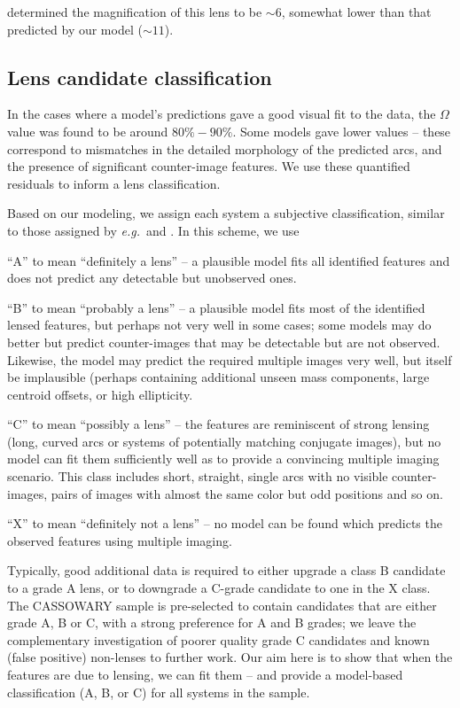 \documentclass[iop]{emulateapj}
\def\eg{{\it e.g.}\,}
\begin{document}
\citeauthor{Pet++10} determined the magnification of this lens to be $\sim 6$,
somewhat lower than that predicted by our model ($\sim 11$). 


\subsection{Lens candidate classification}
\label{sec:results:class}

In the cases where a model's predictions gave a good visual fit to the data,
the $\Omega$ value was found to be around $80\%-90\%$. Some models gave  lower
values -- these correspond to mismatches in the detailed morphology of the
predicted arcs, and the presence of significant counter-image features. We use
these quantified residuals to inform a lens classification.

Based on our modeling, we assign each system a subjective classification, 
similar to those assigned by \eg \citet{Bol++08} and \citet{Mar++09}. In this
scheme, we use
\begin{description}
  \item{``A'' to mean ``definitely a lens''} -- a plausible model fits all
  identified features and does not predict any detectable but unobserved ones.
  \item{``B'' to mean ``probably a lens''} -- a plausible model  fits most of
  the identified lensed features, but perhaps not very well in some cases; some
  models may do better but predict counter-images that may be detectable but
  are  not observed. Likewise, the model may predict the required multiple
  images very well, but itself be implausible (perhaps containing additional
  unseen mass components, large centroid offsets,  or high ellipticity.
  \item{``C'' to mean ``possibly a lens''} -- the features are reminiscent of
  strong lensing (long, curved arcs or systems of potentially matching conjugate
  images), but no model can fit them sufficiently well as to provide a
  convincing multiple imaging scenario. This class includes short, straight,
  single arcs with no visible  counter-images, pairs of images with almost the
  same color but odd positions and so on. 
  \item{``X'' to mean ``definitely not a lens''} -- no model can be found which
  predicts the observed features using multiple imaging. 
\end{description}
Typically,  good additional data is required to either upgrade a class B
candidate to a grade A lens, or to downgrade a C-grade candidate to one in the X
class. The CASSOWARY  sample is pre-selected to contain candidates that are
either grade A, B or C, with a strong preference for A and B grades; we leave
the complementary investigation of poorer quality  grade C candidates and known
(false positive) non-lenses to further work. Our aim here is to show that when
the features are due to lensing, we can fit them -- and provide a model-based
classification (A, B, or C) for all systems in the sample.
\end{document}
